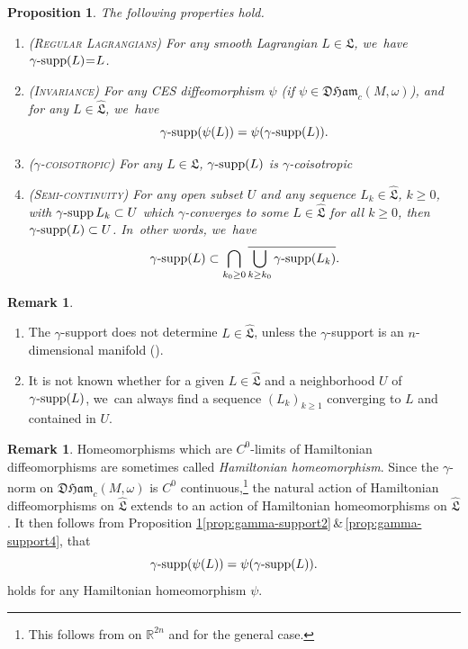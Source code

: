 \documentclass[JEP,XML,SOM,Unicode,NoFloatCountersInSection,published]{cedram}
\newtheorem{prop}[thm]{Proposition}
\theoremstyle{definition}
\newtheorem{rem}[thm]{Remark}
\DeclareMathOperator{\gammasupp}{\gamma\textup{-supp}}
\newcommand{\DHam}{\mathfrak{DHam}}
\newcommand{\fL}{\mathfrak {L}}
\newcommand{\hatL}{\widehat{\fL}}
\begin{document}
\begin{prop}\label{prop:gamma-support}
The following properties hold.
\begin{enumerate}
\item\label{prop:gamma-support1}\!\!\textsc{(Regular Lagrangians)} For any smooth Lagrangian $L\!\in\!\fL$, we~have \hbox{$\gammasupp(L)\mkern-4mu=\mkern-4mu L$}.
\item\label{prop:gamma-support2}\!\!\textsc{(Invariance)} For any CES diffeomorphism $\psi$ (\eg if $\psi\in\DHam_c(M,\omega)$), and for any $L\in\hatL$, we~have\vspace*{-3pt}
\begin{equation*}
\gammasupp(\psi(L))=\psi(\gammasupp(L)).
\end{equation*}
\item\label{prop:gamma-support3}\!\!\label{Prop-2.13-3}\textsc{($\gamma$\nobreakdash-coisotropic)} For any $L\in\fL$, $\gammasupp(L)$ is $\gamma$\nobreakdash-coisotropic

\item\label{prop:gamma-support4}\!\!\textsc{(Semi-continuity)} For any open subset $U$ and any sequence $L_k\in\hatL$, $k\geq0$, with $\gammasupp L_k\subset U$ which $\gamma$\nobreakdash-converges to some $L\in\hatL$ for all $k\geq0$, then $\gammasupp(L)\subset U$. In~other words, we~have\vspace*{-3pt}
\[
\gammasupp(L)\subset\bigcap_{k_0\geq0}\overline{\bigcup_{k\geq k_0}\gammasupp(L_k)}.
\]
\end{enumerate}
\end{prop}

\skpt
\begin{rem}
\begin{enumerate}
\item The $\gamma$\nobreakdash-support does not determine $L\in \hatL$, unless the $\gamma$\nobreakdash-support is an $n$\nobreakdash-dimensional manifold (\cite{AGIV}).
\item It is not known whether for a given $L\in\hatL$ and a neighborhood $U$ of $\gammasupp(L)$, we~can always find a sequence $(L_k)_{k\geq 1}$ converging to $L$ and contained in $U$.
\end{enumerate}
\end{rem}

\begin{rem}\label{rem:sympeo} Homeomorphisms which are $C^0$-limits of Hamiltonian diffeomorphisms are sometimes called \emph{Hamiltonian homeomorphism}. Since the $\gamma$\nobreakdash-norm on $\DHam_c(M,\omega)$ is $C^0$ continuous,\footnote{This follows from \cite{Viterbo-STAGGF} on $\mathbb R^{2n}$ and \cite{BHS-C0} for the general case.} the natural action of Hamiltonian diffeomorphisms on $\hatL$ extends to an action of Hamiltonian homeomorphisms on $\hatL$. It then follows from Proposition \ref{prop:gamma-support}\eqref{prop:gamma-support2}\,\&\,\eqref{prop:gamma-support4}, that\vspace*{-3pt}
\begin{equation*}
\gammasupp(\psi(L))=\psi(\gammasupp(L)).
\end{equation*}
holds for any Hamiltonian homeomorphism $\psi$.
\end{rem}
\end{document}
